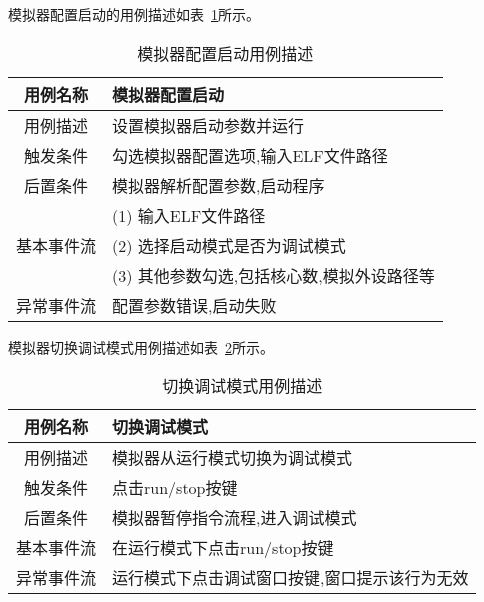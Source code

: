 \clearpage
模拟器配置启动的用例描述如表~\ref{tab:yongli1}所示。
\begin{table}[H]
  \centering
  \caption{模拟器配置启动用例描述}
  \label{tab:yongli1}
  \renewcommand\arraystretch{1.1}
  \begin{tabular}{cl}
    \toprule
用例名称 &	模拟器配置启动\\
    \midrule
用例描述 &	\multicolumn{1}{p{9cm}}{设置模拟器启动参数并运行}\\ \hline
触发条件 &	\multicolumn{1}{p{9cm}}{勾选模拟器配置选项,输入ELF文件路径}\\ \hline
后置条件 &	\multicolumn{1}{p{9cm}}{模拟器解析配置参数,启动程序}\\ \hline
	& \multicolumn{1}{p{9cm}}{(1)	输入ELF文件路径} \\
  基本事件流 & \multicolumn{1}{p{9cm}}{(2)	选择启动模式是否为调试模式} \\
 & \multicolumn{1}{p{9cm}}{(3)	其他参数勾选,包括核心数,模拟外设路径等}\\ \hline
异常事件流	& \multicolumn{1}{p{9cm}}{配置参数错误,启动失败}\\
    \bottomrule
  \end{tabular}
\end{table}


模拟器切换调试模式用例描述如表~\ref{tab:yongli2}所示。
\begin{table}[H]
  \centering
  \caption{切换调试模式用例描述}
  \label{tab:yongli2}
  \renewcommand\arraystretch{1.1}
  \begin{tabular}{cl}
    \toprule
用例名称	& 切换调试模式\\
    \midrule
用例描述	& \multicolumn{1}{p{9cm}}{模拟器从运行模式切换为调试模式}\\ \hline
触发条件	& \multicolumn{1}{p{9cm}}{点击run/stop按键}\\ \hline
后置条件	& \multicolumn{1}{p{9cm}}{模拟器暂停指令流程,进入调试模式}\\ \hline
基本事件流	& \multicolumn{1}{p{9cm}}{在运行模式下点击run/stop按键}\\ \hline
异常事件流	& \multicolumn{1}{p{9cm}}{运行模式下点击调试窗口按键,窗口提示该行为无效}\\
    \bottomrule
  \end{tabular}
\end{table}


